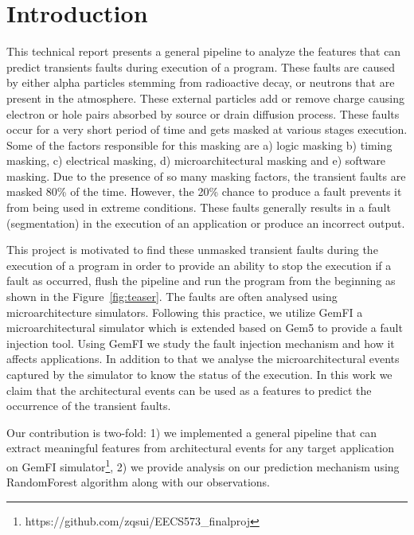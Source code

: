 \section{Introduction}
This technical report presents a general pipeline to analyze the features that can predict transients faults during execution of a program. These faults are caused by either alpha particles stemming from radioactive decay, or neutrons that are present in the atmosphere. These external particles add or remove charge causing electron or hole pairs absorbed by source or drain diffusion process. These faults occur for a very short period of time and gets masked at various stages execution. Some of the factors responsible for this masking are a) logic masking b) timing masking, c) electrical masking, d) microarchitectural masking and e) software masking. Due to the presence of so many masking factors, the transient faults are masked 80\% of the time. However, the 20\% chance to produce a fault prevents it from being used in extreme conditions. These faults generally results in a fault (segmentation) in the execution of an application or produce an incorrect output.

This project is motivated to find these unmasked transient faults during the execution of a program in order to provide an ability to stop the execution if a fault as occurred, flush the pipeline and run the program from the beginning as shown in the Figure~\ref{fig:teaser}. The faults are often analysed using microarchitecture simulators. Following this practice, we utilize GemFI \cite{parasyris2014gemfi} a microarchitectural simulator which is extended based on Gem5 \cite{Binkert:2011:GS:2024716.2024718} to provide a fault injection tool. Using GemFI we study the fault injection mechanism and how it affects applications. In addition to that we analyse the microarchitectural events captured by the simulator to know the status of the execution. In this work we claim that the architectural events can be used as a features to predict the occurrence of the transient faults.

Our contribution is two-fold: 1) we implemented a general pipeline that can extract meaningful features from architectural events for any target application on GemFI simulator\footnote{https://github.com/zqsui/EECS573\_finalproj}, 2) we provide analysis on our prediction mechanism using RandomForest \cite{breiman2001random} algorithm along with our observations.

